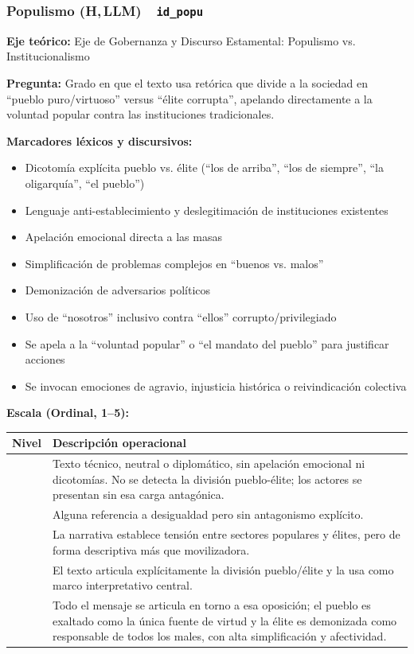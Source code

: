 \documentclass[11pt,letterpaper]{article}
\newcommand{\dimtitulo}[2]{\subsubsection*{#1 \normalfont\small\color{gris}(H,\,LLM)\ \ \texttt{#2}}%
  \addcontentsline{toc}{subsubsection}{#1}}
\begin{document}
\dimtitulo{Populismo}{id\_popu}
\textbf{Eje teórico:} Eje de Gobernanza y Discurso Estamental: Populismo vs. Institucionalismo

\textbf{Pregunta:} Grado en que el texto usa retórica que divide a la sociedad en “pueblo puro/virtuoso”
versus “élite corrupta”, apelando directamente a la voluntad popular contra las instituciones tradicionales.

\textbf{Marcadores léxicos y discursivos:}
\begin{itemize}
\item Dicotomía explícita pueblo vs. élite (“los de arriba”, “los de siempre”, “la oligarquía”, “el pueblo”)
\item Lenguaje anti-establecimiento y deslegitimación de instituciones existentes
\item Apelación emocional directa a las masas
\item Simplificación de problemas complejos en “buenos vs. malos”
\item Demonización de adversarios políticos
\item Uso de “nosotros” inclusivo contra “ellos” corrupto/privilegiado
\item Se apela a la “voluntad popular” o “el mandato del pueblo” para justificar acciones
\item Se invocan emociones de agravio, injusticia histórica o reivindicación colectiva
\end{itemize}

\textbf{Escala (Ordinal, 1–5):}
\begin{longtable}{@{}>{\centering\arraybackslash}p{1.1cm}p{14.3cm}@{}}
\toprule \textbf{Nivel} & \textbf{Descripción operacional}\\ \midrule\endhead
1 & Texto técnico, neutral o diplomático, sin apelación emocional ni dicotomías. No se detecta la división
pueblo-élite; los actores se presentan sin esa carga antagónica.\\
\addlinespace
2 & Alguna referencia a desigualdad pero sin antagonismo explícito.\\
\addlinespace
3 & La narrativa establece tensión entre sectores populares y élites, pero de forma descriptiva más que
movilizadora.\\
\addlinespace
4 & El texto articula explícitamente la división pueblo/élite y la usa como marco interpretativo central.\\
\addlinespace
5 & Todo el mensaje se articula en torno a esa oposición; el pueblo es exaltado como la única fuente de
virtud y la élite es demonizada como responsable de todos los males, con alta simplificación y afectividad.\\
\bottomrule
\end{longtable}
\end{document}
